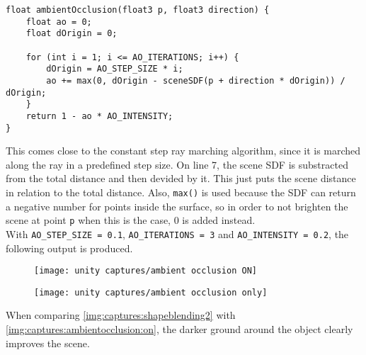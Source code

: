 \begin{lstlisting}[language=HLSL, caption=Implementation of ambient occlusion., label=lst:shader:ambientocclusion]
float ambientOcclusion(float3 p, float3 direction) {
    float ao = 0;
    float dOrigin = 0;

    for (int i = 1; i <= AO_ITERATIONS; i++) {
        dOrigin = AO_STEP_SIZE * i;
        ao += max(0, dOrigin - sceneSDF(p + direction * dOrigin)) / dOrigin;
    }
    return 1 - ao * AO_INTENSITY;
}
\end{lstlisting}

\noindent
This comes close to the constant step ray marching algorithm, since it is marched along the ray in a predefined step size.
On line 7, the scene SDF is substracted from the total distance and then devided by it. This just puts the scene distance in relation to the total distance.
Also, \lstinline[language=HLSL]{max()} is used because the SDF can return a negative number for points inside the surface, so in order to not brighten the scene at point \lstinline[language=HLSL]{p} when this is the case, 0 is added instead.
\\
With \lstinline[language=HLSL]{AO_STEP_SIZE = 0.1}, \lstinline[language=HLSL]{AO_ITERATIONS = 3} and \lstinline[language=HLSL]{AO_INTENSITY = 0.2}, the following output is produced.

\begin{figure}[H]
    \centering
        \begin{minipage}{0.47\linewidth}
            \texttt{[image: unity captures/ambient occlusion ON]}
            \label{img:captures:ambientocclusion:on}
        \end{minipage}
    \hfill
        \begin{minipage}{0.47\linewidth}
            \texttt{[image: unity captures/ambient occlusion only]}
            \label{img:captures:ambientocclusion:only}
        \end{minipage}
\end{figure}

\noindent
When comparing \autoref{img:captures:shapeblending2} with \autoref{img:captures:ambientocclusion:on}, the darker ground around the object clearly improves the scene.